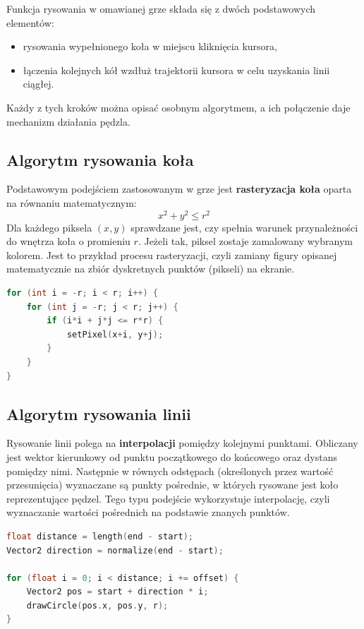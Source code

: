 \documentclass[a4paper,12pt]{book} %
\begin{document}
Funkcja rysowania w omawianej grze składa się z dwóch podstawowych elementów:
\begin{itemize}
    \item rysowania wypełnionego koła w miejscu kliknięcia kursora,
    \item łączenia kolejnych kół wzdłuż trajektorii kursora w celu uzyskania linii ciągłej.
\end{itemize}

Każdy z tych kroków można opisać osobnym algorytmem, a ich połączenie daje mechanizm działania pędzla.

\subsection{Algorytm rysowania koła}

Podstawowym podejściem zastosowanym w grze jest \textbf{rasteryzacja koła}  \cite{Rasteryzacja} oparta na równaniu matematycznym:
\[
x^2 + y^2 \leq r^2
\]
Dla każdego piksela $(x,y)$ sprawdzane jest, czy spełnia warunek przynależności do wnętrza koła o promieniu $r$. 
Jeżeli tak, piksel zostaje zamalowany wybranym kolorem. 
Jest to przykład procesu rasteryzacji, czyli zamiany figury opisanej matematycznie na zbiór dyskretnych punktów (pikseli) na ekranie.

\begin{lstlisting}[language=C++, caption={Przykład algorytmu rysowania koła}, label={lst:circle}]
for (int i = -r; i < r; i++) {
    for (int j = -r; j < r; j++) {
        if (i*i + j*j <= r*r) {
            setPixel(x+i, y+j);
        }
    }
}
\end{lstlisting}


\subsection{Algorytm rysowania linii}

Rysowanie linii polega na \textbf{interpolacji} \cite{Interpolacja} pomiędzy kolejnymi punktami. 
Obliczany jest wektor kierunkowy od punktu początkowego do końcowego oraz dystans pomiędzy nimi. 
Następnie w równych odstępach (określonych przez wartość przesunięcia) 
wyznaczane są punkty pośrednie, w których rysowane jest koło reprezentujące pędzel. 
Tego typu podejście wykorzystuje interpolację, czyli wyznaczanie wartości pośrednich na podstawie znanych punktów.


\begin{lstlisting}[language=C++, caption={Przykład algorytmu rysowania linii}, label={lst:line}]
float distance = length(end - start);
Vector2 direction = normalize(end - start);

for (float i = 0; i < distance; i += offset) {
    Vector2 pos = start + direction * i;
    drawCircle(pos.x, pos.y, r);
}
\end{lstlisting}
\end{document}
